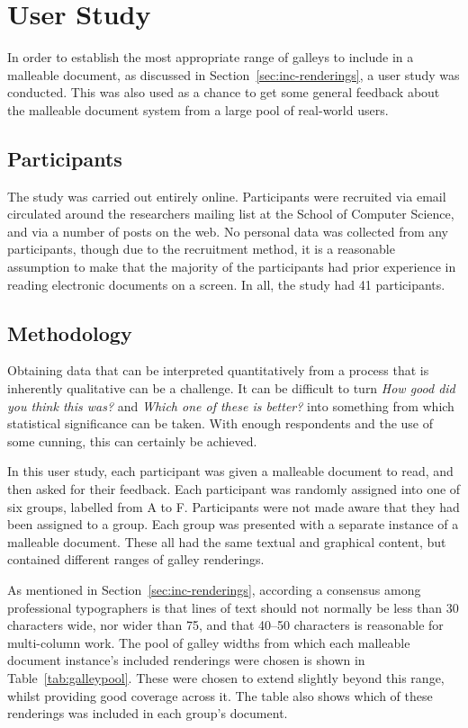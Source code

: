 \section{User Study}
\label{sec:survey}
In order to establish the most appropriate range of galleys to include in a malleable document, as discussed in Section~\ref{sec:inc-renderings}, a user study was conducted. This was also used as a chance to get some general feedback about the malleable document system from a large pool of real-world users.

\subsection{Participants}
The study was carried out entirely online. Participants were recruited via email circulated around the researchers mailing list at the School of Computer Science, and via a number of posts on the web. No personal data was collected from any participants, though due to the recruitment method, it is a reasonable assumption to make that the majority of the participants had prior experience in reading electronic documents on a screen. In all, the study had 41 participants.

\subsection{Methodology}
Obtaining data that can be interpreted quantitatively from a process that is inherently qualitative can be a challenge. It can be difficult to turn \emph{How good did you think this was?} and \emph{Which one of these is better?} into something from which statistical significance can be taken. With enough respondents and the use of some cunning, this can certainly be achieved.

In this user study, each participant was given a malleable document to read, and then asked for their feedback. Each participant was randomly assigned into one of six groups, labelled from A to F. Participants were not made aware that they had been assigned to a group. Each group was presented with a separate instance of a malleable document. These all had the same textual and graphical content, but contained different ranges of galley renderings.

As mentioned in Section~\ref{sec:inc-renderings}, according a consensus among professional typographers is that lines of text should not normally be less than 30 characters wide, nor wider than 75, and that 40--50 characters is reasonable for multi-column work. The pool of galley widths from which each malleable document instance's included renderings were chosen is shown in Table~\ref{tab:galleypool}. These were chosen to extend slightly beyond this range, whilst providing good coverage across it. The table also shows which of these renderings was included in each group's document.

